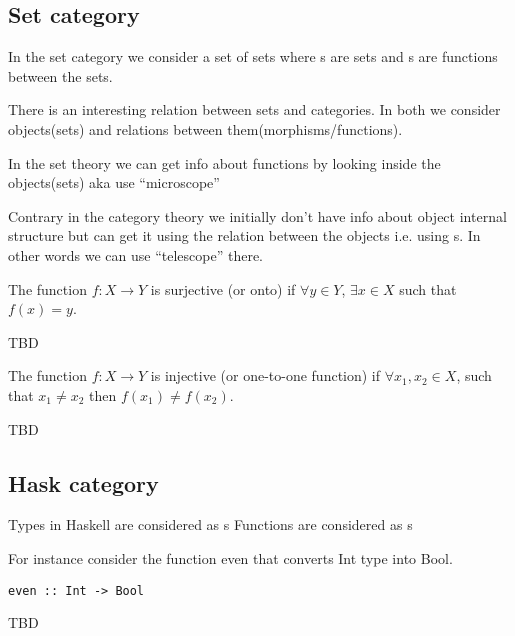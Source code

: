 \subsection{\textbf{Set} category}
\begin{example}
\label{ex:setcategory}
In the set category we consider a set of sets where
s are sets and s are
functions between the sets. 
\end{example}

\begin{remark}
\label{rem:set_vs_category}
There is an interesting relation between sets and categories. In both
we consider objects(sets) and relations between
them(morphisms/functions). 

In the set theory we can get info about functions by looking inside
the objects(sets) aka use ``microscope'' \cite{bib:milewski2018category} 

Contrary in the category theory we initially don't have info about object
internal structure but can get it using the relation between the
objects i.e. using s. In other words we can use
``telescope'' \cite{bib:milewski2018category}  there.
\end{remark}

\begin{definition}[Surjection]
  \label{def:surjection}
  The function $f: X \rightarrow Y$ is surjective (or onto) if
  $\forall y \in Y$, $\exists x \in X$ such that
  $f\left(x\right) = y$.
\end{definition}

\begin{remark}
\label{rem:surjection_epimorphism}
TBD
\end{remark}

\begin{definition}[Injection]
  \label{def:injection}
  The function $f: X \rightarrow Y$ is injective (or one-to-one function) if
  $\forall x_1, x_2 \in X$, such that $x_1 \ne x_2$ then
  $f\left(x_1\right) \ne f\left(x_2\right)$.
\end{definition}

\begin{remark}
\label{rem:injection_monomorphism}
TBD
\end{remark}


\subsection{\textbf{Hask} category}
\begin{example}
\label{ex:haskcategory}
Types in Haskell are considered as s
Functions are considered as s

For instance consider the function even that converts Int type
into Bool.
\begin{verbatim}
even :: Int -> Bool
\end{verbatim}
\end{example}


TBD

